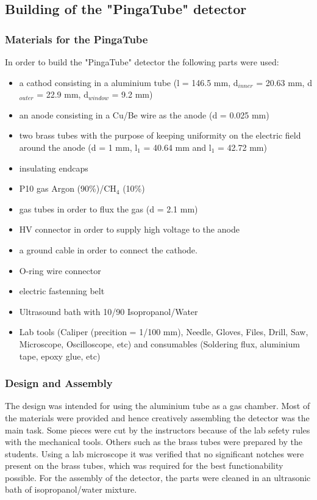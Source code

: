 \subsection{Building of the "PingaTube" detector}
\label{sec:building_pingatube}


\subsubsection{Materials for the PingaTube}
\label{sec:materials_pingatube}

In order to build the "PingaTube" detector the following parts were used:
\begin{itemize}
\item a cathod consisting in a aluminium tube (l = 146.5 mm, d$_{inner}$ = 20.63
  mm, d$_{outer}$ = 22.9 mm, d$_{window}$ = 9.2 mm)
\item an anode consisting in a Cu/Be wire as the anode (d = 0.025 mm)
\item two brass tubes with the purpose of keeping uniformity on the electric
  field around the anode (d = 1 mm, l$_{1}$ = 40.64 mm and l$_{1}$ = 42.72 mm)
\item insulating endcaps
\item P10 gas Argon (90\%)/CH$_{4}$ (10\%)
\item gas tubes in order to flux the gas (d = 2.1 mm)
\item HV connector in order to supply high voltage to the anode
\item a ground cable in order to connect the cathode.
\item O-ring wire connector
\item electric fastenning belt
\item Ultrasound bath with 10/90 Isopropanol/Water
\item Lab tools (Caliper (precition = 1/100 mm), Needle, Gloves, Files, Drill,
  Saw, Microscope, Oscilloscope, etc) and consumables (Soldering flux, aluminium
  tape, epoxy glue, etc)
\end{itemize}

\subsubsection{Design and Assembly}
\label{sec:design_and_assembly_beercan}
The design was intended for using the aluminium tube as a gas chamber. Most of
the materials were provided and hence creatively assembling the detector was the
main task.  Some pieces were cut by the instructors because of the lab sefety
rules with the mechanical tools. Others such as the brass tubes were prepared by
the students.  Using a lab microscope it was verified that no significant
notches were present on the brass tubes, which was required for the best
functionability possible.  For the assembly of the detector, the parts were
cleaned in an ultrasonic bath of isopropanol/water mixture.

